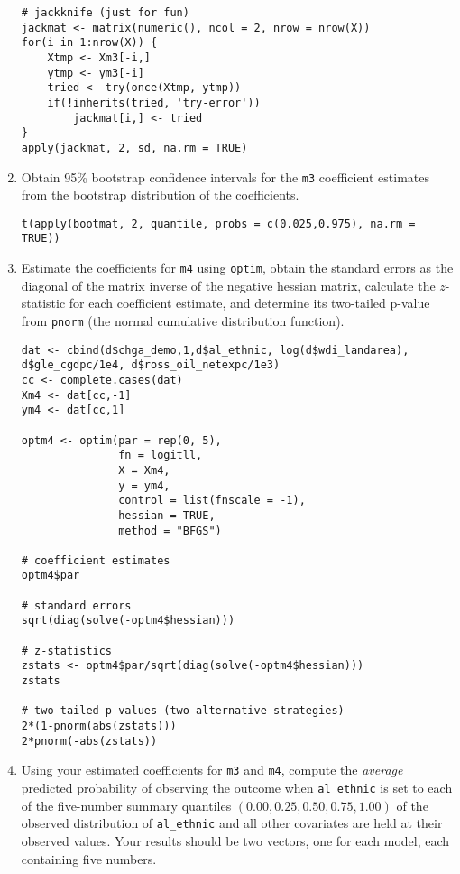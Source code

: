 \documentclass[a4paper,12pt]{article}
\begin{document}
\begin{enumerate}
\begin{solution}
\begin{lstlisting}
# jackknife (just for fun)
jackmat <- matrix(numeric(), ncol = 2, nrow = nrow(X))
for(i in 1:nrow(X)) {
    Xtmp <- Xm3[-i,]
    ytmp <- ym3[-i]
    tried <- try(once(Xtmp, ytmp))
    if(!inherits(tried, 'try-error'))
        jackmat[i,] <- tried
}
apply(jackmat, 2, sd, na.rm = TRUE)
\end{lstlisting}
\end{solution}

\item Obtain 95\% bootstrap confidence intervals for the \texttt{m3} coefficient estimates from the bootstrap distribution of the coefficients.

\begin{solution}
\begin{lstlisting}
t(apply(bootmat, 2, quantile, probs = c(0.025,0.975), na.rm = TRUE))
\end{lstlisting}
\end{solution}

\item Estimate the coefficients for \texttt{m4} using \texttt{optim}, obtain the standard errors as the diagonal of the matrix inverse of the negative hessian matrix, calculate the $z$-statistic for each coefficient estimate, and determine its two-tailed p-value from \texttt{pnorm} (the normal cumulative distribution function).

\begin{solution}
\begin{lstlisting}
dat <- cbind(d$chga_demo,1,d$al_ethnic, log(d$wdi_landarea), d$gle_cgdpc/1e4, d$ross_oil_netexpc/1e3)
cc <- complete.cases(dat)
Xm4 <- dat[cc,-1]
ym4 <- dat[cc,1]

optm4 <- optim(par = rep(0, 5),
               fn = logitll,
               X = Xm4,
               y = ym4,
               control = list(fnscale = -1),
               hessian = TRUE,
               method = "BFGS")

# coefficient estimates
optm4$par

# standard errors
sqrt(diag(solve(-optm4$hessian)))

# z-statistics
zstats <- optm4$par/sqrt(diag(solve(-optm4$hessian)))
zstats

# two-tailed p-values (two alternative strategies)
2*(1-pnorm(abs(zstats)))
2*pnorm(-abs(zstats))
\end{lstlisting}
\end{solution}


\item Using your estimated coefficients for \texttt{m3} and \texttt{m4}, compute the \textit{average} predicted probability of observing the outcome when \texttt{al\_ethnic} is set to each of the five-number summary quantiles $(0.00, 0.25, 0.50, 0.75, 1.00)$ of the observed distribution of \texttt{al\_ethnic} and all other covariates are held at their observed values. Your results should be two vectors, one for each model, each containing five numbers.


\end{enumerate}
\end{document}
